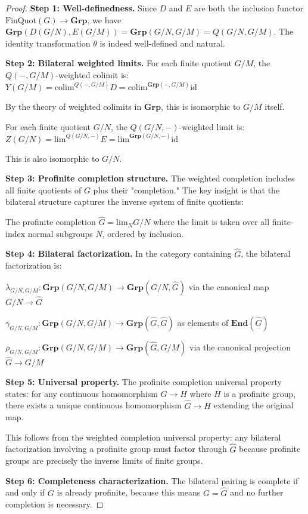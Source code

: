 \documentclass[11pt]{article}
\theoremstyle{plain}
\theoremstyle{definition}
\theoremstyle{remark}
\newcommand{\colim}{\mathrm{colim}}
\renewcommand{\lim}{\mathrm{lim}}
\begin{document}
\begin{proof}
\textbf{Step 1: Well-definedness.}
Since $D$ and $E$ are both the inclusion functor $\mathrm{FinQuot}(G) \to \mathbf{Grp}$, we have $\mathbf{Grp}(D(G/N), E(G/M)) = \mathbf{Grp}(G/N, G/M) = Q(G/N, G/M)$. The identity transformation $\theta$ is indeed well-defined and natural.

\textbf{Step 2: Bilateral weighted limits.}
For each finite quotient $G/M$, the $Q(-, G/M)$-weighted colimit is:
$Y(G/M) = \colim^{Q(-, G/M)} D = \colim^{\mathbf{Grp}(-, G/M)} \text{id}$

By the theory of weighted colimits in $\mathbf{Grp}$, this is isomorphic to $G/M$ itself.

For each finite quotient $G/N$, the $Q(G/N, -)$-weighted limit is:
$Z(G/N) = \lim^{Q(G/N, -)} E = \lim^{\mathbf{Grp}(G/N, -)} \text{id}$

This is also isomorphic to $G/N$.

\textbf{Step 3: Profinite completion structure.}
The weighted completion includes all finite quotients of $G$ plus their "completion." The key insight is that the bilateral structure captures the inverse system of finite quotients:

The profinite completion $\widehat{G} = \lim_{N} G/N$ where the limit is taken over all finite-index normal subgroups $N$, ordered by inclusion.

\textbf{Step 4: Bilateral factorization.}
In the category containing $\widehat{G}$, the bilateral factorization is:

$\lambda_{G/N, G/M} : \mathbf{Grp}(G/N, G/M) \to \mathbf{Grp}(G/N, \widehat{G})$ via the canonical map $G/N \to \widehat{G}$

$\gamma_{G/N, G/M} : \mathbf{Grp}(G/N, G/M) \to \mathbf{Grp}(\widehat{G}, \widehat{G})$ as elements of $\mathbf{End}(\widehat{G})$

$\rho_{G/N, G/M} : \mathbf{Grp}(G/N, G/M) \to \mathbf{Grp}(\widehat{G}, G/M)$ via the canonical projection $\widehat{G} \to G/M$

\textbf{Step 5: Universal property.}
The profinite completion universal property states: for any continuous homomorphism $G \to H$ where $H$ is a profinite group, there exists a unique continuous homomorphism $\widehat{G} \to H$ extending the original map.

This follows from the weighted completion universal property: any bilateral factorization involving a profinite group must factor through $\widehat{G}$ because profinite groups are precisely the inverse limits of finite groups.

\textbf{Step 6: Completeness characterization.}
The bilateral pairing is complete if and only if $G$ is already profinite, because this means $G = \widehat{G}$ and no further completion is necessary.
\end{proof}
\end{document}
